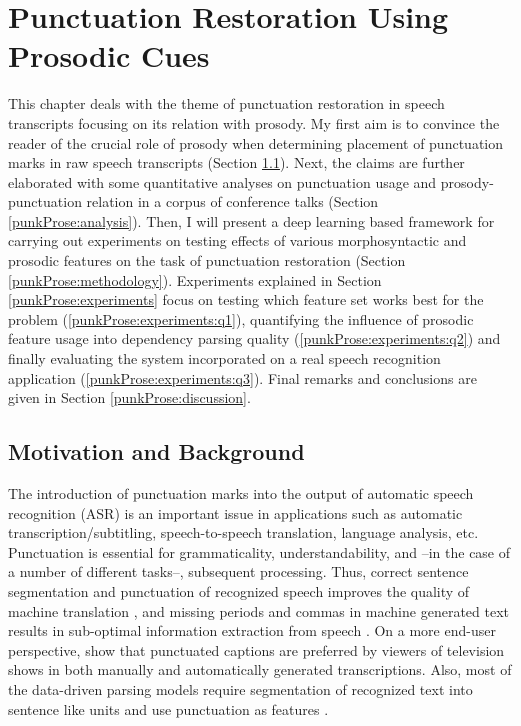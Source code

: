 
\chapter{Punctuation Restoration Using Prosodic Cues}
\label{chapter:punkProse}

This chapter deals with the theme of punctuation restoration in speech transcripts focusing on its relation with prosody. My first aim is to convince the reader of the crucial role of prosody when determining placement of punctuation marks in raw speech transcripts (Section \ref{punkProse:motivation}). Next, the claims are further elaborated with some quantitative analyses on punctuation usage and prosody-punctuation relation in a corpus of conference talks (Section \ref{punkProse:analysis}). Then, I will present a deep learning based framework \citep{punkProse_slsp} for carrying out experiments on testing effects of various morphosyntactic and prosodic features on the task of punctuation restoration (Section \ref{punkProse:methodology}). Experiments explained in Section \ref{punkProse:experiments} focus on testing which feature set works best for the problem (\ref{punkProse:experiments:q1}), quantifying the influence of prosodic feature usage into dependency parsing quality (\ref{punkProse:experiments:q2}) and finally evaluating the system incorporated on a real speech recognition application (\ref{punkProse:experiments:q3}). Final remarks and conclusions are given in Section \ref{punkProse:discussion}. 

\section{Motivation and Background}
\label{punkProse:motivation}
The introduction of punctuation marks into the output of automatic speech recognition (ASR) is an important issue in applications such as automatic transcription/subtitling, speech-to-speech translation, language analysis, etc. Punctuation is essential for grammaticality, understandability, and --in the case of a number of different tasks--, subsequent processing. Thus, correct sentence segmentation and punctuation of recognized speech improves the quality of machine translation \citep{matusov2006automatic,peitz2011modeling, Cho2017NMTbasedSA, lu2010better}, and missing periods and commas in machine generated text results in sub-optimal information extraction from speech \citep{favre2008punctuating, hillard2006impact}. On a more end-user perspective, \cite{Tundik2018} show that punctuated captions are preferred by viewers of television shows in both manually and automatically generated transcriptions. Also, most of the data-driven parsing models require segmentation of recognized text into sentence like units and use punctuation as features \citep{Jones:1994:ERP:991886.991960, Spitkovsky_punctuation, MaPunc}. 

